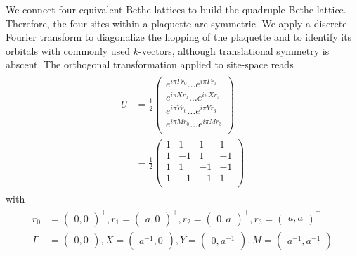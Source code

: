 \documentclass[aps,prb,twocolumn,groupedaddress,amsmath,amssymb]{revtex4-1}
\begin{document}
We connect four equivalent Bethe-lattices to build the quadruple Bethe-lattice. Therefore, the four sites within a plaquette are symmetric. We apply a discrete Fourier transform to diagonalize the hopping of the plaquette and to identify its orbitals with commonly used $k$-vectors, although translational symmetry is abscent. The orthogonal transformation applied to site-space reads
\begin{align}
  \label{eq:ktransform}
  \begin{split}
    U&=\frac{1}{2}
    \begin{pmatrix}
      e^{i\pi\Gamma r_0}\ldots e^{i\pi\Gamma r_3}\\
      e^{i\pi X r_0}\ldots e^{i\pi X r_3}\\
      e^{i\pi Y r_0}\ldots e^{i\pi Y r_3}\\
      e^{i\pi M r_0}\ldots e^{i\pi M r_3}\\
    \end{pmatrix}\\
    &=\frac{1}{2}
    \begin{pmatrix}
      1&1&1&1\\
      1&-1&1&-1\\
      1&1&-1&-1\\
      1&-1&-1&1\\
    \end{pmatrix}
  \end{split}
\end{align}
with
\begin{align}
  \label{eq:ktransform2}
  \begin{split}
    r_0&=\begin{pmatrix}0,0\end{pmatrix}^\intercal,r_1=\begin{pmatrix}a,0\end{pmatrix}^\intercal, r_2=\begin{pmatrix}0,a\end{pmatrix}^\intercal,r_3=\begin{pmatrix}a,a\end{pmatrix}^\intercal\\
    \Gamma&=\begin{pmatrix}0,0\end{pmatrix},X=\begin{pmatrix}a^{-1},0\end{pmatrix},Y=\begin{pmatrix}0,a^{-1}\end{pmatrix},M=\begin{pmatrix}a^{-1},a^{-1}\end{pmatrix}
  \end{split}
\end{align}
\end{document}
